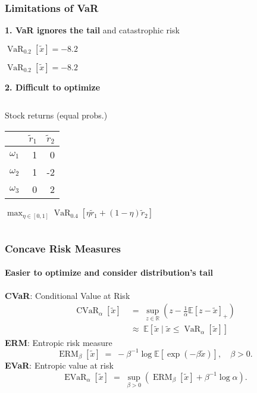 \documentclass{beamer}
\renewcommand{\exp}[1]{\operatorname{exp}\left( #1\right) }
\newcommand{\E}{\mathbb{E}}
\newcommand{\Ex}[1]{\E \left[#1 \right]}
\DeclareMathOperator{\varo}{VaR}
\DeclareMathOperator{\cvaro}{CVaR}
\DeclareMathOperator{\evaro}{EVaR}
\DeclareMathOperator{\ermo}{ERM}
\newcommand{\erm}[2]{\ermo_{#1}\left[#2\right]}
\newcommand{\var}[2]{\varo_{#1} \left[#2\right]}
\newcommand{\cvar}[2]{\cvaro_{#1} \left[#2\right]}
\newcommand{\evar}[2]{\evaro_{#1} \left[#2\right]}
\begin{document}
\begin{frame} \frametitle{Limitations of VaR}
  \textbf{1. VaR ignores the tail} and catastrophic risk \\ 
  \begin{center}
    \begin{minipage}{0.42\linewidth}
        \centering
        {\small $\var{0.2}{\tilde{x}} = -8.2$}
    \end{minipage}
    \hspace{0.1\linewidth}
    \begin{minipage}{0.42\linewidth}
        \centering
        {\small $\var{0.2}{\tilde{x}} = -8.2$}
    \end{minipage}
  \end{center}
  \vfill
  \textbf{2. Difficult to optimize}\\[0.2cm]
  \begin{columns}
    \begin{column}{0.45\linewidth}
        {\small
            Stock returns (equal probs.)
            \begin{center}
            \begin{tabular}[t]{|l|rr|}
            \hline
            &$\tilde{r}_1$ & $\tilde{r}_2$ \\
        \hline 
            $\omega_1$ & 1 & 0 \\
            $\omega_2$ & 1 & -2 \\
            $\omega_3$ & 0 &  2 \\
            \hline
        \end{tabular}
            \end{center}
        $ \max_{\eta \in [0,1]} \var{0.4}{\eta \tilde{r}_1 + (1-\eta) \tilde{r}_2} $
        }
    \end{column}
    \begin{column}{0.55\linewidth}
      \centering
    \end{column}
  \end{columns}
\end{frame}

\begin{frame} \frametitle{Concave Risk Measures}
  \framesubtitle{Easier to optimize and consider distribution's tail}
  \textbf{CVaR}: Conditional Value at Risk
  \begin{align*}
    \cvar{\alpha}{\tilde{x}}
    &\; =\;  \sup_{z\in\mathbb R}\left(z - \frac{1}{\alpha} \E\left[z - \tilde{x}\right]_{+} \right) \\
    &\; \approx\;  \Ex{\tilde{x} \mid  \tilde{x} \le \var{\alpha}{\tilde{x}}}
\end{align*}
  \vfill
  \textbf{ERM}: Entropic risk measure 
  \[
    \erm{\beta}{\tilde{x}} \;=\;  -\beta^{-1}\log \mathbb{E}\left[\exp{-\beta \tilde{x}}\right] ,\quad\beta>0.
  \]
  \vfill 
  \textbf{EVaR}: Entropic value at risk 
  \[
    \evar{\alpha}{\tilde{x}} \;=\;  \sup_{\beta>0}\left(\erm{\beta}{\tilde{x}} + \beta^{-1} \log  \alpha\right).
  \]
\end{frame}
\end{document}
